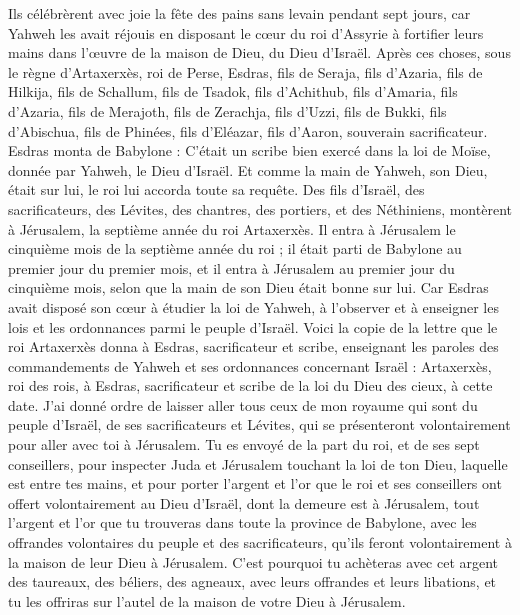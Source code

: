 \begin{multicols}{2}
Ils célébrèrent avec joie la fête des pains sans levain pendant sept jours, car Yahweh les avait réjouis en disposant  le cœur du roi d'Assyrie à fortifier leurs mains dans l’œuvre de la maison de Dieu, du Dieu d'Israël.
\VerseOne{}Après ces choses, sous le règne d'Artaxerxès, roi de Perse, Esdras, fils de Seraja, fils d'Azaria, fils de Hilkija,
fils de Schallum, fils de Tsadok, fils d'Achithub,
fils d'Amaria, fils d'Azaria, fils de Merajoth,
fils de Zerachja, fils d'Uzzi, fils de Bukki,
fils d'Abischua, fils de Phinées, fils d'Eléazar, fils d'Aaron, souverain sacrificateur.
Esdras monta de Babylone : C’était un scribe bien exercé dans la loi de Moïse, donnée par Yahweh, le Dieu d'Israël. Et comme la main de Yahweh, son Dieu, était sur lui, le roi lui accorda toute sa requête.
Des fils d'Israël, des sacrificateurs, des Lévites, des chantres, des portiers, et des Néthiniens, montèrent à Jérusalem, la septième année du roi Artaxerxès.
Il entra à Jérusalem le cinquième mois de la septième année du roi ;
il était parti de Babylone au premier jour du premier mois, et il entra à Jérusalem au premier jour du cinquième mois, selon que la main de son Dieu était bonne sur lui.
Car Esdras avait disposé son cœur à étudier la loi de Yahweh, à l’observer et à enseigner les lois et les ordonnances parmi le peuple d'Israël.
Voici la copie de la lettre que le roi Artaxerxès donna à Esdras, sacrificateur et scribe, enseignant les paroles des commandements de Yahweh et ses ordonnances concernant Israël :
Artaxerxès, roi des rois, à Esdras, sacrificateur et scribe de la loi du Dieu des cieux, à cette date.
J’ai donné ordre de laisser aller tous ceux de mon royaume qui sont du peuple d'Israël, de ses sacrificateurs et Lévites, qui se présenteront volontairement pour aller avec toi à Jérusalem.
Tu es envoyé de la part du roi, et de ses sept conseillers, pour inspecter Juda et Jérusalem touchant la loi de ton Dieu, laquelle est entre tes mains,
et pour porter l'argent et l'or que le roi et ses conseillers ont offert volontairement au Dieu d'Israël, dont la demeure est à Jérusalem,
tout l'argent et l'or que tu trouveras dans toute la province de Babylone, avec les offrandes volontaires du peuple et des sacrificateurs, qu'ils feront volontairement à la maison de leur Dieu à Jérusalem.
 C'est pourquoi tu achèteras avec cet argent des taureaux, des béliers, des agneaux, avec leurs offrandes et leurs libations, et tu les offriras sur l'autel de la maison de votre Dieu à Jérusalem.

\end{multicols}
